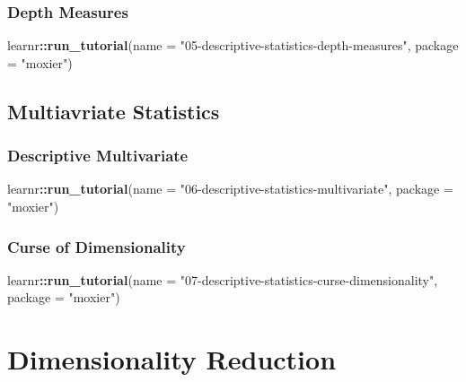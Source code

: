 \documentclass[]{book}
\newenvironment{Shaded}{\begin{snugshade}}{\end{snugshade}}
\newcommand{\KeywordTok}[1]{\textcolor[rgb]{0.13,0.29,0.53}{\textbf{#1}}}
\newcommand{\DataTypeTok}[1]{\textcolor[rgb]{0.13,0.29,0.53}{#1}}
\newcommand{\StringTok}[1]{\textcolor[rgb]{0.31,0.60,0.02}{#1}}
\newcommand{\OperatorTok}[1]{\textcolor[rgb]{0.81,0.36,0.00}{\textbf{#1}}}
\newcommand{\NormalTok}[1]{#1}
\begin{document}
\subsection{Depth Measures}\label{depth-measures}

\begin{Shaded}
\begin{Highlighting}[]
\NormalTok{learnr}\OperatorTok{::}\KeywordTok{run_tutorial}\NormalTok{(}\DataTypeTok{name =} \StringTok{"05-descriptive-statistics-depth-measures"}\NormalTok{,}
                     \DataTypeTok{package =} \StringTok{"moxier"}\NormalTok{)}
\end{Highlighting}
\end{Shaded}

\section{Multiavriate Statistics}\label{multiavriate-statistics}

\subsection{Descriptive Multivariate}\label{descriptive-multivariate}

\begin{Shaded}
\begin{Highlighting}[]
\NormalTok{learnr}\OperatorTok{::}\KeywordTok{run_tutorial}\NormalTok{(}\DataTypeTok{name =} \StringTok{"06-descriptive-statistics-multivariate"}\NormalTok{,}
                     \DataTypeTok{package =} \StringTok{"moxier"}\NormalTok{)}
\end{Highlighting}
\end{Shaded}

\subsection{Curse of Dimensionality}\label{curse-of-dimensionality}

\begin{Shaded}
\begin{Highlighting}[]
\NormalTok{learnr}\OperatorTok{::}\KeywordTok{run_tutorial}\NormalTok{(}\DataTypeTok{name =} \StringTok{"07-descriptive-statistics-curse-dimensionality"}\NormalTok{,}
                     \DataTypeTok{package =} \StringTok{"moxier"}\NormalTok{)}
\end{Highlighting}
\end{Shaded}

\chapter{Dimensionality Reduction}\label{dimensionality-reduction}
\end{document}

